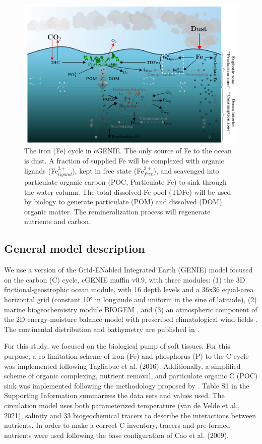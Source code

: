 
\begin{figure}[h!]
    \includegraphics[scale=0.8]{../Paper_Draft/tikz/Fe.pdf}
    \caption{The iron (Fe) cycle in cGENIE. The only source of Fe to the ocean is dust. A fraction of supplied Fe will be complexed with organic ligands (Fe$^{3+}_{ligand}$), kept in free state (Fe$^{3+}_{free}$), and scavenged into particulate organic carbon (POC, Particulate Fe) to sink through the water column. The total dissolved Fe pool (TDFe) will be used by biology to generate particulate (POM) and dissolved (DOM) organic matter. The remineralization process will regenerate nutrients and carbon.}
\end{figure}

\subsection{General model description}

We use a version of the Grid-ENabled Integrated Earth (GENIE) model focused on the carbon (C) cycle, cGENIE muffin v0.9, with three modules: (1) the 3D frictional-geostrophic ocean module, with 16 depth levels and a 36x36 equal-area horizontal grid (constant 10° in longitude and uniform in the sine of latitude), (2) marine biogeochemistry module BIOGEM \cite{ridgwell2007marine}, and (3) an atmospheric component of the 2D energy-moisture balance model with prescribed climatological wind fields \cite{cao2009role}. The continental distribution and bathymetry are published in .

For this study, we focused on the biological pump of soft tissues. For this purpose, a co-limitation scheme of iron (Fe) and phosphorus (P) to the C cycle was implemented following Tagliabue et al. (2016). Additionally, a simplified scheme of organic complexing, nutrient removal, and particulate organic C (POC) sink was implemented following the methodology proposed by . Table S1 in the Supporting Information summarizes the data sets and values used. The circulation model uses both parameterized temperature (van de Velde et al., 2021), salinity and 33 biogeochemical tracers to describe the interactions between nutrients. In order to make a correct C inventory, tracers and pre-formed nutrients were used following the base configuration of Cao et al. (2009).

